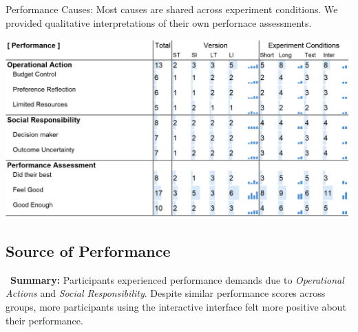


\begin{table}[h]
    \caption{Performance Causes: Most causes are shared across experiment conditions. We provided qualitative interpretations of their own perfornace assessments.}
    \label{tbl:physical}
    \includegraphics[width=\linewidth]{content/image/cog/perf_table.png}
\end{table}

\subsection{Source of Performance}
\label{sec:performance}
\vspace{5pt}

\begin{tldrbox}
    \faInfoCircle~\xspace\textbf{Summary:} Participants experienced performance demands due to \textit{Operational Actions} and \textit{Social Responsibility}. Despite similar performance scores across groups, more participants using the interactive interface felt more positive about their performance.
\end{tldrbox}

